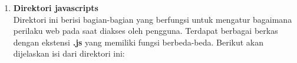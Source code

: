 \begin{enumerate}
\begin{enumerate}
	
		\item \textbf{Direktori javascripts} \\
		Direktori ini berisi bagian-bagian yang berfungsi untuk mengatur bagaimana perilaku web pada saat diakses oleh pengguna. Terdapat berbagai berkas dengan ekstensi \textbf{.js} yang memiliki fungsi berbeda-beda. Berikut akan dijelaskan isi dari direktori ini:
		

\end{enumerate}
\end{enumerate}
